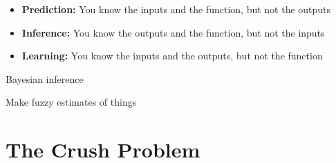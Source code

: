 \documentclass[aspectratio=169,xcolor=svgnames]{beamer}
\begin{document}
\begin{frame}
  \begin{itemize}
  \item \textbf{Prediction:} You know the inputs and the function, but not the outputs
  \item \textbf{Inference:} You know the outputs and the function, but not the inputs
  \item \textbf{Learning:} You know the inputs and the outputs, but not the function
  \end{itemize}
\end{frame}

\begin{frame}
  \center
  \huge
  Bayesian inference

  \small
  Make fuzzy estimates of things
\end{frame}

\section{The Crush Problem}

\newcommand{\love}[0]{{\NotoEmoji ❤️}\xspace}
\newcommand{\flowers}[0]{{\emoji{bouquet}}\xspace}
\end{document}
